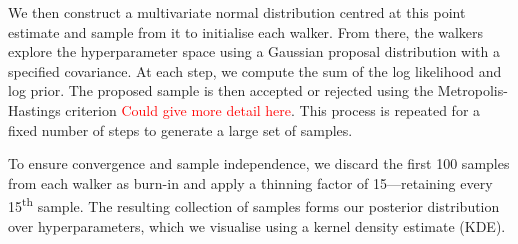 \documentclass{article}
\begin{document}
\noindent
We then construct a multivariate normal distribution centred at this point estimate and sample from it to initialise each walker. From there, the walkers explore the hyperparameter space using a Gaussian proposal distribution with a specified covariance. At each step, we compute the sum of the log likelihood and log prior. The proposed sample is then accepted or rejected using the Metropolis-Hastings criterion \textcolor{red}{Could give more detail here}. This process is repeated for a fixed number of steps to generate a large set of samples.

\noindent
To ensure convergence and sample independence, we discard the first 100 samples from each walker as burn-in and apply a thinning factor of 15—retaining every 15\textsuperscript{th} sample. The resulting collection of samples forms our posterior distribution over hyperparameters, which we visualise using a kernel density estimate (KDE).
\end{document}

